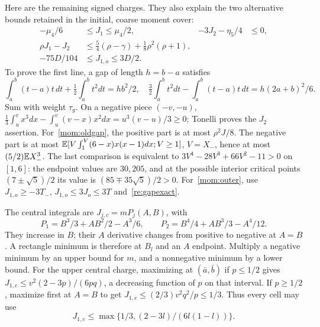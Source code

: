 Here are the remaining signed charges. They also explain the two
alternative bounds retained in the initial, coarse moment cover:
\begin{align}
 -\mu_4/6&\le J_1\le\mu_4/2,&
 -3J_2-\eta_5/4&\le0,                                  \label{mom:gap-signs}\\
 \rho J_1-J_2&\le\tfrac54(\rho-\gamma)+\tfrac18\rho^2(\rho+1),
                                                              \label{mom:oldgap}\\
 -75D/104&\le J_{1,o}\le3D/2.                           \label{mom:outer}
\end{align}
To prove the first line, a gap of length $h=b-a$ satisfies
\[
 \int_a^b(t-a)t\,dt+\tfrac12\int_a^bt^2dt=hb^2/2,\quad
 \tfrac32\int_a^bt^2dt-\int_a^b(t-a)t\,dt=h(2a+b)^2/6.
\]
Sum with weight $\tau_g$. On a negative piece $(-v,-u)$,
$\frac13\int_u^v x^3dx-\int_u^v(v-x)x^2dx=u^3(v-u)/3\ge0$;
Tonelli proves the $J_2$ assertion. For~\eqref{mom:oldgap}, the positive
part is at most $\rho^2J/8$. The negative part is at most
$\mathbb E[V\int_1^V(6-x)x(x-1)dx;V\ge1]$, $V=X_-$, hence at most
$(5/2)\mathbb E X_-^3$. The last comparison is equivalent to
$3V^4-28V^3+66V^2-11>0$ on $[1,6]$: the endpoint values are $30,205$,
and at the possible interior critical points $(7\pm\sqrt5)/2$ its value
is $(85\mp35\sqrt5)/2>0$.
For~\eqref{mom:outer}, use $J_{1,o}\ge-3T_-$,
$J_{1,o}\le3J_o\le3T$ and~\eqref{re:gapexact}.

The central integrals are $J_{j,c}=mP_j(A,B)$, with
\[
 P_1=B^3/3+AB^2/2-A^3/6,\qquad
 P_2=B^4/4+AB^3/3-A^4/12.
\]
They increase in $B$; their $A$ derivative changes from positive to negative
at $A=B$. A rectangle minimum is therefore at $B_l$ and an $A$ endpoint.
Multiply a negative minimum by an upper bound for $m$, and a nonnegative
minimum by a lower bound. For the upper central charge, maximizing at
$(\bar a,\bar b)$ if $p\le1/2$ gives
$J_{1,c}\le v^2(2-3p)/(6pq)$, a decreasing function of $p$ on that interval.
If $p\ge1/2$, maximize first at $A=B$ to get
$J_{1,c}\le(2/3)v^2q^2/p\le1/3$. Thus every cell may use
\begin{equation}\label{mom:central-upper}
 J_{1,c}\le\max\{1/3,(2-3l)/(6l(1-l))\}.
\end{equation}


